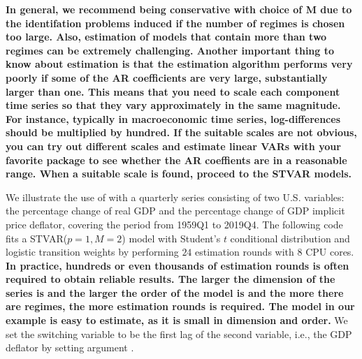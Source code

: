 \documentclass[nojss]{jss}
\begin{document}
\textbf{In general, we recommend being conservative with choice of M due to the identifation problems induced if the number of regimes is chosen too large. Also, estimation of models that contain more than two regimes can be extremely challenging. Another important thing to know about estimation is that the estimation algorithm performs very poorly if some of the AR coefficients are very large, substantially larger than one. This means that you need to scale each component time series so that they vary approximately in the same magnitude. For instance, typically in macroeconomic time series, log-differences should be multiplied by hundred. If the suitable scales are not obvious, you can try out different scales and estimate linear VARs with your favorite package to see whether the AR coeffients are in a reasonable range. When a suitable scale is found, proceed to the STVAR models.}

We illustrate the use of  with a quarterly series consisting of two U.S. variables: the percentage change of real GDP and the percentage change of GDP implicit price deflator, covering the period from 1959Q1 to 2019Q4. The following code fits a STVAR($p=1,M=2$) model with Student's $t$ conditional distribution and logistic transition weights by performing $24$ estimation rounds with $8$ CPU cores. \textbf{In practice, hundreds or even thousands of estimation rounds is often required to obtain reliable results. The larger the dimension of the series is and the larger the order of the model is and the more there are regimes, the more estimation rounds is required. The model in our example is easy to estimate, as it is small in dimension and order.} We set the switching variable to be the first lag of the second variable, i.e., the GDP deflator by setting argument .
\end{document}

